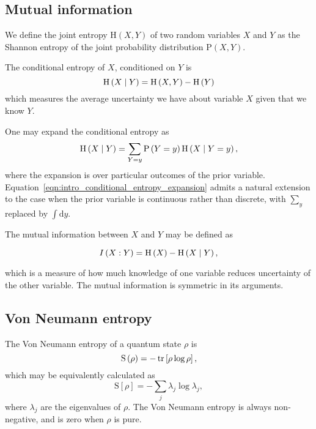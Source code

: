 \FloatBarrier
\subsection{Mutual information}
We define the joint entropy $\text{H}\left(X, Y\right)$ of two random variables $X$ and $Y$ as the Shannon entropy of the joint probability distribution $\text{P}\left(X, Y\right)$. 

The conditional entropy of $X$, conditioned on $Y$ is
\begin{equation}
\text{H}\left(X \; \middle| \; Y\right) = \text{H}\left(X, Y\right) - \text{H}\left(Y\right)
\end{equation}
which measures the average uncertainty we have about variable $X$ given that we know $Y$.

One may expand the conditional entropy as \cite{Wilde2013}
\begin{equation}\label{eqn:intro_conditional_entropy_expansion}
\text{H}\left(X \; \middle| \; Y\right) = \sum_{Y=y} \text{P}\left(Y=y\right) \text{H}\left( X \; \middle| \; Y=y \right),
\end{equation}
where the expansion is over particular outcomes of the prior variable. Equation~\ref{eqn:intro_conditional_entropy_expansion} admits a natural extension to the case when the prior variable is continuous rather than discrete, with $\sum_{y}$ replaced by $\int \mathrm{d}y$.


The mutual information between $X$ and $Y$ may be defined as

\begin{equation}\label{eqn:intro_mutual_information}
I\left(X : Y\right) = \text{H}\left(X\right) - \text{H}\left(X \; \middle| \; Y\right),
\end{equation}

\noindent which is a measure of how much knowledge of one variable reduces uncertainty of the other variable. The mutual information is symmetric in its arguments.


\FloatBarrier
\subsection{Von Neumann entropy}
The Von Neumann entropy of a quantum state $\rho$ is
\begin{equation}
\text{S}\left(\rho\right) = - \tr\left[\rho \log \rho \right],
\end{equation}
which may be equivalently calculated as
\begin{equation}
\text{S}\left[\rho\right] = - \sum_j \lambda_j \log \lambda_j,
\end{equation}
where $\lambda_j$ are the eigenvalues of $\rho$. The Von Neumann entropy is always non-negative, and is zero when $\rho$ is pure.

